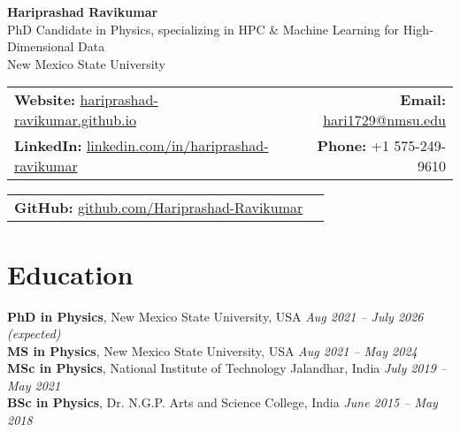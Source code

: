 \documentclass[11pt]{article}
\begin{document}
\begin{center}
  \textbf{\Huge Hariprashad Ravikumar} \\
  \vspace{0.5em}
  PhD Candidate in Physics, specializing in HPC \& Machine Learning for High‐Dimensional Data \\
  New Mexico State University \\
\end{center}

\begin{tabularx}{\textwidth}{@{}Xr@{}}
    \textbf{Website:} \href{https://hariprashad-ravikumar.github.io}{hariprashad-ravikumar.github.io} & \textbf{Email:} \href{mailto:hari1729@nmsu.edu}{hari1729@nmsu.edu}  \\
    \textbf{LinkedIn:} \href{https://www.linkedin.com/in/hariprashad-ravikumar}{linkedin.com/in/hariprashad-ravikumar} & \textbf{Phone:} +1 575-249-9610 
\end{tabularx}
\vspace{-1em}
\begin{tabularx}{\textwidth}{@{}Xr@{}}
\textbf{GitHub:} \href{https://github.com/Hariprashad-Ravikumar}{github.com/Hariprashad-Ravikumar}  \\
\end{tabularx}

\vspace{0.5em}
\section*{Education}
\vspace{0.3em}

\textbf{PhD in Physics}, New Mexico State University, USA \hfill \textit{Aug 2021 – July 2026 (expected)} \\
\textbf{MS in Physics}, New Mexico State University, USA \hfill \textit{Aug 2021 – May 2024} \\
\textbf{MSc in Physics}, National Institute of Technology Jalandhar, India \hfill \textit{July 2019 – May 2021} \\
\textbf{BSc in Physics}, Dr. N.G.P. Arts and Science College, India \hfill \textit{June 2015 – May 2018}
\end{document}
